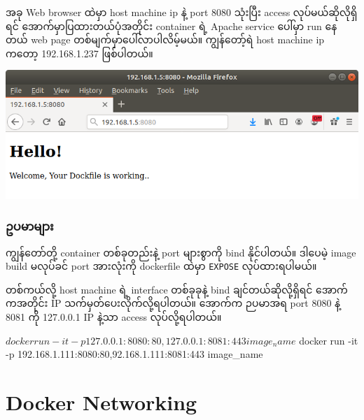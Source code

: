 \documentclass[]{article}
\newenvironment{Shaded}{}{}
\newcommand{\ExtensionTok}[1]{#1}
\newcommand{\NormalTok}[1]{#1}
\begin{document}
အခု Web browser ထဲမှာ host machine ip နဲ့ port 8080 သုံးပြီး access
လုပ်မယ်ဆိုလိုရှိရင် အောက်မှာပြထားတယ်ပုံအတိုင်း container ရဲ့ Apache
service ပေါ်မှာ run နေတယ် web page တစ်မျက်မှာပေါ်လာပါလိမ့်မယ်။
ကျွန်တော့်ရဲ host machine ip ကတော့ 192.168.1.237 ဖြစ်ပါတယ်။

\includegraphics{.gitbook/assets/docker_file_and_docker_port.png}

\hypertarget{ux1025ux1015ux1019ux102cux1019ux103bux102cux1038}{%
\subsubsection{ဥပမာများ}\label{ux1025ux1015ux1019ux102cux1019ux103bux102cux1038}}

ကျွန်တော်တို့ container တစ်ခုတည်းနဲ့ port များစွာကို bind နိုင်ပါတယ်။
ဒါပေမဲ့ image build မလုပ်ခင် port အားလုံးကို dockerfile ထဲမှာ
\texttt{EXPOSE} လုပ်ထားရပါမယ်။

\begin{Shaded}
\end{Shaded}

တစ်ကယ်လို့ host machine ရဲ့ interface တစ်ခုခုနဲ့ bind
ချင်တယ်ဆိုလို့ရှိရင် အောက်ကအတိုင်း IP သက်မှတ်ပေးလိုက်လို့ရပါတယ်။ အောက်က
ဉပမာအရ port 8080 နဲ့ 8081 ကို 127.0.0.1 IP နဲ့သာ access လုပ်လို့ရပါတယ်။

\begin{Shaded}
\begin{Highlighting}[]
\NormalTok{$ }\ExtensionTok{docker}\NormalTok{ run -it -p 127.0.0.1:8080:80,127.0.0.1:8081:443 image_name}
\NormalTok{$ }\ExtensionTok{docker}\NormalTok{ run -it -p 192.168.1.111:8080:80,92.168.1.111:8081:443 image_name}
\end{Highlighting}
\end{Shaded}

\pagebreak

\hypertarget{docker-networking}{%
\section{Docker Networking}\label{docker-networking}}
\end{document}
